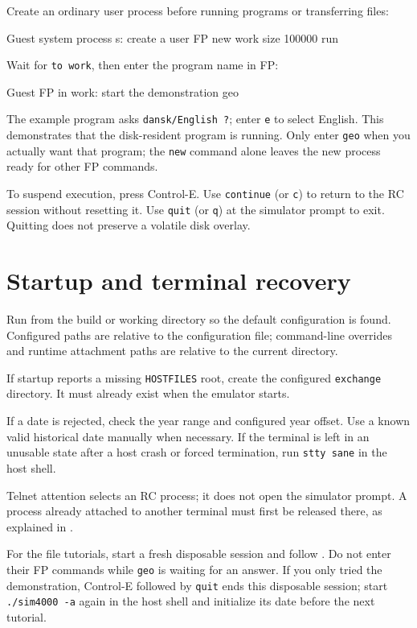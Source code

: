 Create an ordinary user process before running programs or transferring files:

\begin{commandexample}{Guest system process s: create a user FP}
new work size 100000 run
\end{commandexample}

Wait for \passthrough{\lstinline!to work!}, then enter the program name in FP:

\begin{commandexample}{Guest FP in work: start the demonstration}
geo
\end{commandexample}

The example program asks \passthrough{\lstinline!dansk/English ?!}; enter \passthrough{\lstinline!e!} to select English. This demonstrates that the disk-resident program is running. Only enter \passthrough{\lstinline!geo!} when you actually want that program; the \passthrough{\lstinline!new!} command alone leaves the new process ready for other FP commands.

To suspend execution, press Control-E. Use \passthrough{\lstinline!continue!} (or \passthrough{\lstinline!c!}) to return to the RC session without resetting it. Use \passthrough{\lstinline!quit!} (or \passthrough{\lstinline!q!}) at the simulator prompt to exit. Quitting does not preserve a volatile disk overlay.

\section{Startup and terminal recovery}\label{startup-and-terminal-recovery}

Run from the build or working directory so the default configuration is found. Configured paths are relative to the configuration file; command-line overrides and runtime attachment paths are relative to the current directory.

If startup reports a missing \passthrough{\lstinline!HOSTFILES!} root, create the configured \passthrough{\lstinline!exchange!} directory. It must already exist when the emulator starts.

If a date is rejected, check the year range and configured year offset. Use a known valid historical date manually when necessary. If the terminal is left in an unusable state after a host crash or forced termination, run \passthrough{\lstinline!stty sane!} in the host shell.

Telnet attention selects an RC process; it does not open the simulator prompt. A process already attached to another terminal must first be released there, as explained in .

For the file tutorials, start a fresh disposable session and follow
.
Do not enter their FP commands while \texttt{geo} is waiting for an answer.
If you only tried the demonstration, Control-E followed by \texttt{quit}
ends this disposable session; start \texttt{./sim4000 -a} again in the host
shell and initialize its date before the next tutorial.
